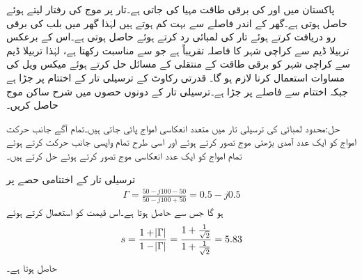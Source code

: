 پاکستان میں  اور  کی برقی طاقت مہیا کی جاتی ہے۔تار پر موج کی رفتار  لیتے ہوئے  حاصل ہوتی ہے۔گھر کے اندر فاصلے  سے بہت کم ہوتے ہیں لہٰذا گھر میں  بلب کی برقی رو دریافت کرتے ہوئے  تار کی لمبائی رد کرتے ہوئے   حاصل ہوتی ہے۔اس کے برعکس تربیلا ڈیم سے کراچی شہر کا فاصلہ تقریباً  ہے جو  سے مناسبت رکھتا ہے، لہٰذا تربیلا ڈیم سے کراچی شہر کو برقی طاقت کے منتقلی کے مسائل حل کرتے ہوئے میکس ویل کی مساوات استعمال کرنا لازم ہو گا۔ 
قدرتی رکاوٹ  کے ترسیلی تار کے اختتام پر  جڑا ہے جبکہ اختتام سے  فاصلے پر   جڑا ہے۔ترسیلی تار کے دونوں حصوں میں شرح ساکن موج  حاصل کریں۔

حل:محدود لمبائی کی ترسیلی تار میں متعدد انعکاسی امواج پائی جاتی ہیں۔تمام آگے جانب حرکت امواج کو ایک عدد آمدی بڑھتی موج تصور کرتے ہوئے اور اسی طرح تمام واپسی جانب حرکت کرتے ہوئے تمام امواج کو ایک عدد انعکاسی موج تصور کرتے ہوئے حل کرتے ہیں۔

ترسیلی تار کے اختتامی حصے پر
\begin{align*}
\Gamma=\frac{50-j100-50}{50-j100+50}=0.5-j0.5 
\end{align*}
ہو گا جس سے   حاصل ہوتا ہے۔اس قیمت کو استعمال کرتے ہوئے
\begin{align*}
s=\frac{1+\abs{\Gamma}}{1-\abs{\Gamma}}=\frac{1+\frac{1}{\sqrt{2}}}{1+\frac{1}{\sqrt{2}}}=5.83
\end{align*}
حاصل ہوتا ہے۔

